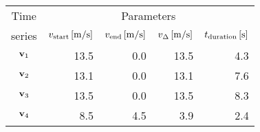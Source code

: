 \begin{tabular}{crrrr}
    \toprule
    Time & \multicolumn{4}{c}{Parameters} \\
    series & $\parvstart\,[\unit{m/s}]$ & $\parvend\,[\unit{m/s}]$ & $\pardv\,[\unit{m/s}]$ & $\pardt\,[\unit{s}]$ \\\otoprule
    $\textbf{v}_{1}$ & 13.5 & 0.0 & 13.5 & 4.3 \\
    $\textbf{v}_{2}$ & 13.1 & 0.0 & 13.1 & 7.6 \\
    $\textbf{v}_{3}$ & 13.5 & 0.0 & 13.5 & 8.3 \\
    $\textbf{v}_{4}$ & 8.5 & 4.5 & 3.9 & 2.4 \\
    \bottomrule
\end{tabular}
